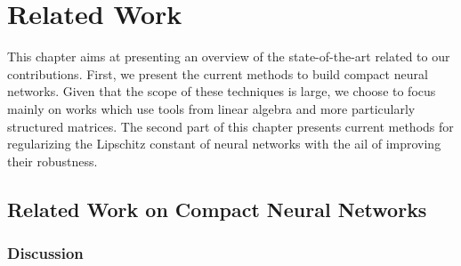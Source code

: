 \chapter{Related Work}
\label{chapter:ch3-related_work}
\localtoc
\vspace{1cm}


This chapter aims at presenting an overview of the state-of-the-art related to our contributions.
First, we present the current methods to build compact neural networks.  
Given that the scope of these techniques is large, we choose to focus mainly on works which use tools from linear algebra and more particularly structured matrices.
The second part of this chapter presents current methods for regularizing the Lipschitz constant of neural networks with the ail of improving their robustness. 




\section{Related Work on Compact Neural Networks}
\label{section:ch3-related_work_on_compact_neural_networks}



\subsection{Discussion}

